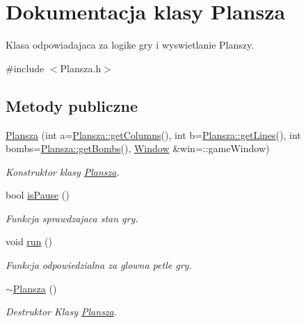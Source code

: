 \hypertarget{class_plansza}{}\section{Dokumentacja klasy Plansza}
\label{class_plansza}


Klasa odpowiadajaca za logike gry i wyswietlanie Planszy.  




{\ttfamily \#include $<$Plansza.\+h$>$}

\subsection*{Metody publiczne}
\begin{DoxyCompactItemize}
\item 
\hyperlink{class_plansza_a526fcce132482d87bd11cfbd3252671b}{Plansza} (int a=\hyperlink{class_plansza_a606c563302f64d39fa3542874aed744e}{Plansza\+::get\+Columns}(), int b=\hyperlink{class_plansza_a61d0d0599fa772b75f633089a4d3b12a}{Plansza\+::get\+Lines}(), int bombs=\hyperlink{class_plansza_a8d3c8a148a2b88969b04b661ca833de7}{Plansza\+::get\+Bombs}(), \hyperlink{class_window}{Window} \&win=\+::game\+Window)
\begin{DoxyCompactList}\small\item\em Konstruktor klasy \hyperlink{class_plansza}{Plansza}. \end{DoxyCompactList}\item 
bool \hyperlink{class_plansza_a511ac13ebb4efb199052dd02927b932c}{is\+Pause} ()
\begin{DoxyCompactList}\small\item\em Funkcja sprawdzajaca stan gry. \end{DoxyCompactList}\item 
void \hyperlink{class_plansza_a916fd5990699501f56bc6a12f371e12a}{run} ()
\begin{DoxyCompactList}\small\item\em Funkcja odpowiedzialna za glowna petle gry. \end{DoxyCompactList}\item 
\hyperlink{class_plansza_a4f246f46c88413936c5ee794e97032fc}{$\sim$\+Plansza} ()
\begin{DoxyCompactList}\small\item\em Destruktor Klasy \hyperlink{class_plansza}{Plansza}. \end{DoxyCompactList}\end{DoxyCompactItemize}
